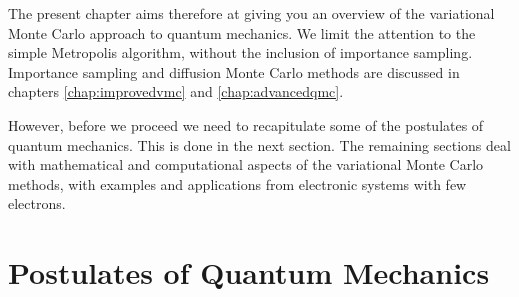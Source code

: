 The present chapter aims therefore at giving you an overview of the variational Monte Carlo approach to quantum mechanics.
We limit the attention to the simple Metropolis algorithm, without the inclusion of importance sampling.
Importance sampling and diffusion Monte Carlo methods  are discussed in chapters \ref{chap:improvedvmc} and \ref{chap:advancedqmc}.
  
However, before we proceed  we need to recapitulate some of the postulates of quantum mechanics. 
This is done in the next section. The remaining sections deal with mathematical and computational aspects of the variational 
Monte Carlo methods, with examples and applications from electronic systems with few electrons. 

\section{Postulates of Quantum Mechanics}
